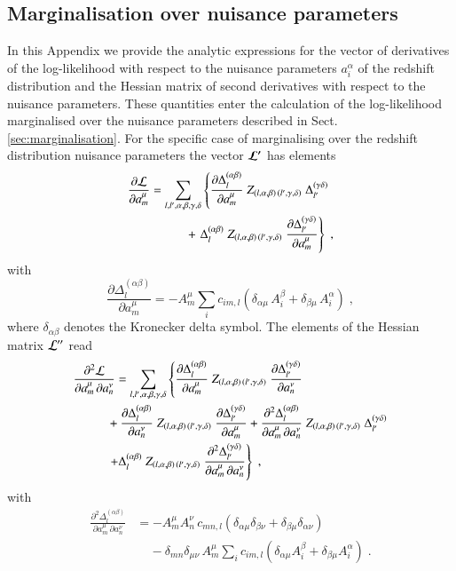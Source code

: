 \documentclass{aa}
\newcommand{\eq}[1]{\begin{equation}  #1 \end{equation}}
\newcommand{\eqa}[1]{\begin{align}   #1 \end{align}}
\newcommand{\br}[1]{\left( #1 \right)}
\newcommand{\nn}{\nonumber}
\begin{document}
\begin{appendix} 
\section{Marginalisation over nuisance parameters}
\label{ap:derivatives}
In this Appendix we provide the analytic expressions for the vector of derivatives of the log-likelihood with respect to the nuisance parameters $a_i^\alpha$ of the redshift distribution and the Hessian matrix of second derivatives with respect to the nuisance parameters. These quantities enter the calculation of the log-likelihood marginalised over the nuisance parameters described in Sect. \ref{sec:marginalisation}.
For the specific case of marginalising over the redshift distribution nuisance parameters the vector $\boldsymbol{\cal L^\prime}$ has elements
\eqa{
\frac{\partial {\cal L}}{\partial a_m^\mu} &= \sum_{l,l',\alpha,\beta,\gamma,\delta}  \left\{ \frac{\partial \Delta_l^{(\alpha \beta)}}{\partial a_m^\mu}\; Z_{(l,\alpha,\beta) \,  (l',\gamma,\delta)}\; \Delta_{l'}^{(\gamma \delta)} \right. \\ \nn
& \hspace*{1cm} + \left. \Delta_l^{(\alpha \beta)}\; Z_{(l,\alpha,\beta) \,  (l',\gamma,\delta)}\; \frac{\partial \Delta_{l'}^{(\gamma \delta)}}{\partial a_m^\mu} \right\}\;,
}
with
\eq{
\frac{\partial \Delta_l^{(\alpha \beta)}}{\partial a_m^\mu} = - A_m^\mu \sum_i c_{im,l} \br{\delta_{\alpha \mu}\, A_i^\beta + \delta_{\beta \mu}\, A_i^\alpha}\;,
}
where $\delta_{\alpha \beta}$ denotes the Kronecker delta symbol. The elements of the Hessian matrix ${\cal L^{\prime\prime}}$ read
\eqa{
\label{eq:hessian}
\frac{\partial^2 {\cal L}}{\partial a_m^\mu\, \partial a_n^\nu} &= \sum_{l,l',\alpha,\beta,\gamma,\delta} 
\left\{ 
\frac{\partial \Delta_l^{(\alpha \beta)}}{\partial a_m^\mu}\; Z_{(l,\alpha,\beta) \,  (l',\gamma,\delta)}\; \frac{\partial \Delta_{l'}^{(\gamma \delta)}}{\partial a_n^\nu}  \right. \\ \nn
& \!\!\!\! + \frac{\partial \Delta_l^{(\alpha \beta)}}{\partial a_n^\nu}\; Z_{(l,\alpha,\beta) \,  (l',\gamma,\delta)}\; \frac{\partial \Delta_{l'}^{(\gamma \delta)}}{\partial a_m^\mu} 
+ \frac{\partial^2 \Delta_l^{(\alpha \beta)}}{\partial a_m^\mu\, \partial a_n^\nu}\; Z_{(l,\alpha,\beta) \,  (l',\gamma,\delta)}\; \Delta_{l'}^{(\gamma \delta)} \\ \nn
& \!\!\!\! \left. + \Delta_l^{(\alpha \beta)}\; Z_{(l,\alpha,\beta) \,  (l',\gamma,\delta)}\; \frac{\partial^2 \Delta_{l'}^{(\gamma \delta)}}{\partial a_m^\mu\, \partial a_n^\nu}
\right\}\;,
}
with 
\eqa{
\frac{\partial^2 \Delta_l^{(\alpha \beta)}}{\partial a_m^\mu\, \partial a_n^\nu} &= - A_m^\mu A_n^\nu \, c_{mn,l} \br{ \delta_{\alpha \mu} \delta_{\beta \nu} + \delta_{\beta \mu} \delta_{\alpha \nu} }\\ \nn
& ~~~~~ - \delta_{mn} \delta_{\mu \nu}\, A_m^\mu \sum_i c_{im,l} \br{\delta_{\alpha \mu} A_i^\beta + \delta_{\beta \mu} A_i^\alpha}\;.
}

\end{appendix}
\end{document}
